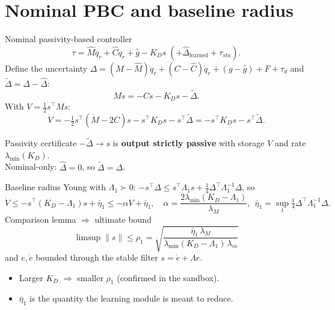\documentclass[aspectratio=169,10pt]{beamer}
\newcommand{\lmin}{\lambda_{\min}}
\newcommand{\dq}{\dot q}
\begin{document}
\section{Nominal PBC and baseline radius}
\begin{frame}{Nominal passivity-based controller}
\[
\tau=\hat M\ddot q_r+\hat{C}\dq_r+\hat g-K_Ds\;(+\hat\Delta_{\text{learned}}+\tau_{sta}).
\]
Define the uncertainty $\Delta=(M-\hat M)\ddot q_r+(C-\hat C)\dq_r+(g-\hat g)+F+\tau_d$ and $\tilde\Delta=\Delta-\hat\Delta$:
\[
M\dot s=-Cs-K_Ds-\tilde\Delta .
\]
With $V=\tfrac12 s^\top Ms$:
\[
\dot V=-\tfrac12s^\top(\dot M-2C)s-s^\top K_Ds-s^\top\tilde\Delta=-s^\top K_Ds-s^\top\tilde\Delta .
\]
\begin{block}{Passivity certificate}
$-\tilde\Delta\to s$ is \textbf{output strictly passive} with storage $V$ and rate $\lmin(K_D)$.\\
Nominal-only: $\hat\Delta=0$, so $\tilde\Delta=\Delta$.
\end{block}
\end{frame}

\begin{frame}{Baseline radius}
Young with $\Lambda_1\succ0$: $-s^\top\Delta\le s^\top\Lambda_1s+\tfrac14\Delta^\top\Lambda_1^{-1}\Delta$, so
\[
\dot V\le-s^\top(K_D-\Lambda_1)s+\bar\eta_1\le-\alpha V+\bar\eta_1,\quad
\alpha=\frac{2\lmin(K_D-\Lambda_1)}{\lambda_M},\ \ \bar\eta_1=\sup_t\tfrac14\Delta^\top\Lambda_1^{-1}\Delta .
\]
Comparison lemma $\Rightarrow$ ultimate bound
\[
\boxed{\ \limsup\|s\|\le\rho_1=\sqrt{\frac{\bar\eta_1\,\lambda_M}{\lmin(K_D-\Lambda_1)\,\lambda_m}}\ }
\]
and $e,\dot e$ bounded through the stable filter $s=\dot e+\Lambda e$.
\begin{itemize}
\item Larger $K_D$ $\Rightarrow$ smaller $\rho_1$ (confirmed in the sandbox).
\item $\bar\eta_1$ is the quantity the learning module is meant to reduce.
\end{itemize}
\end{frame}
\end{document}
